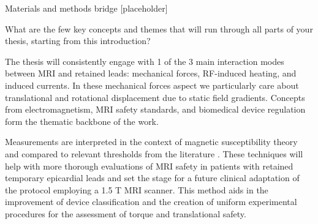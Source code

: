 Materials and methods bridge [placeholder]

What are the few key concepts and themes that will run through all parts of your thesis, starting from this introduction?

The thesis will consistently engage with 1 of the 3 main interaction modes between MRI and retained leads: mechanical forces, RF-induced heating, and induced currents. In these mechanical forces aspect we particularly care about translational and rotational displacement due to static field gradients. Concepts from electromagnetism, MRI safety standards, and biomedical device regulation form the thematic backbone of the work.

Measurements are interpreted in the context of magnetic susceptibility theory and compared to relevant thresholds from the literature \cite{haddixProposal,astmF2052}. These techniques will help with more thorough evaluations of MRI safety in patients with retained temporary epicardial leads and set the stage for a future clinical adaptation of the protocol employing a 1.5 T MRI scanner. This method aids in the improvement of device classification and the creation of uniform experimental procedures for the assessment of torque and translational safety.

